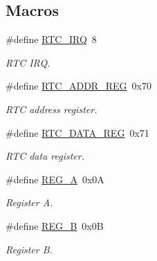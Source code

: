 \subsection*{Macros}
\begin{DoxyCompactItemize}
\item 
\mbox{\label{group___r_t_c___macros_ga4e22feb6ffbc1cda32fadff5c740dc51}} 
\#define \hyperlink{group___r_t_c___macros_ga4e22feb6ffbc1cda32fadff5c740dc51}{R\+T\+C\+\_\+\+I\+RQ}~8
\begin{DoxyCompactList}\small\item\em R\+TC I\+RQ. \end{DoxyCompactList}\item 
\mbox{\label{group___r_t_c___macros_ga710b98232df2c563009e6f8a6cd18220}} 
\#define \hyperlink{group___r_t_c___macros_ga710b98232df2c563009e6f8a6cd18220}{R\+T\+C\+\_\+\+A\+D\+D\+R\+\_\+\+R\+EG}~0x70
\begin{DoxyCompactList}\small\item\em R\+TC address register. \end{DoxyCompactList}\item 
\mbox{\label{group___r_t_c___macros_ga2f258a00c59c3f347c8d2d4a75471ce0}} 
\#define \hyperlink{group___r_t_c___macros_ga2f258a00c59c3f347c8d2d4a75471ce0}{R\+T\+C\+\_\+\+D\+A\+T\+A\+\_\+\+R\+EG}~0x71
\begin{DoxyCompactList}\small\item\em R\+TC data register. \end{DoxyCompactList}\item 
\mbox{\label{group___r_t_c___macros_gaa0e40d1cb9fea79e800aa79b8ca291f7}} 
\#define \hyperlink{group___r_t_c___macros_gaa0e40d1cb9fea79e800aa79b8ca291f7}{R\+E\+G\+\_\+A}~0x0A
\begin{DoxyCompactList}\small\item\em Register A. \end{DoxyCompactList}\item 
\mbox{\label{group___r_t_c___macros_ga28ed75c6727784e56c2bb8d828c876c9}} 
\#define \hyperlink{group___r_t_c___macros_ga28ed75c6727784e56c2bb8d828c876c9}{R\+E\+G\+\_\+B}~0x0B
\begin{DoxyCompactList}\small\item\em Register B. \end{DoxyCompactList}\item 

\end{DoxyCompactItemize}
